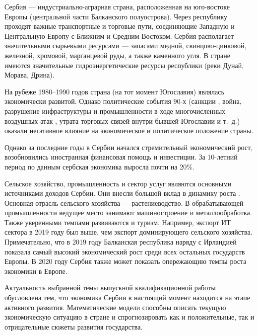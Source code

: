 \pagebreak
\intro
{}

Сербия --- индустриально-аграрная страна, расположенная на юго-востоке Европы (центральной части Балканского полуострова).
Через республику проходят важные транспортные и торговые пути, соединяющие Западную и Центральную Европу с Ближним и Средним Востоком.
Сербия располагает значительными сырьевыми ресурсами --- запасами медной, свинцово-цинковой, железной, хромовой, марганцевой руды, а также каменного угля.
В стране имеются значительные гидроэнергетические ресурсы республики (реки Дунай, Морава, Дрина).

На рубеже 1980--1990 годов страна (на тот момент Югославия) являлась экономически развитой.
Однако политические события 90-х (санкции , война, разрушение инфраструктуры и промышленности в ходе многочисленных воздушных атак , утрата торговых связей внутри бывшей Югославии и т.~д.) оказали негативное влияние на экономическое и политическое положение страны.

Однако за последние годы в Сербии начался стремительный экономический рост, возобновились иностранная финансовая помощь и инвестиции.
За 10-летний период по данным  сербская экономика выросла почти на 20\%.

Сельское хозяйство, промышленность и сектор услуг являются основными источниками доходов Сербии.
Они внесли большой вклад в динамику роста .
Основная отрасль сельского хозяйства --- растениеводство.
В обрабатывающей промышленности ведущее место занимают машиностроение и металлообработка.
Также уверенными темпами развиваются  и туризм.
Например, экспорт ИТ сектора в 2019 году был выше, чем экспорт доминирующего сельского хозяйства.
Примечательно, что в 2019 году Балканская республика наряду с Ирландией показала самый высокий экономический рост среди всех остальных государств Европы.
В 2020 году Сербия также может показать опережающию темпы роста экономики в Европе.

\underline{Актуальность выбранной темы выпускной квалификационной работы } обусловлена тем, что экономика Сербии в настоящий момент находится на этапе активного развития.
Математические модели способны описать текущую экономическую ситуацию в стране и спрогнозировать как и положительные, так и отрицательные сюжеты развития государства.

